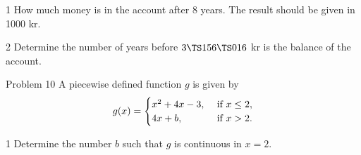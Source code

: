 \begin{delopgave}{1}
	How much money is in the account after 8 years. The result should be given in 1000 kr. 
\end{delopgave}
\begin{delopgave}{2}
	Determine the number of years before $3 \TS 156 \TS 016$ kr is the balance of the account.
\end{delopgave}
%
%
\begin{opgavetekst}{Problem 10}
	A piecewise defined function $g$ is given by
	\begin{align*}
		g(x) = 
		\begin{cases}
			x^2 + 4x - 3,  &\textnormal{ if }x \leq 2,\\
			4x + b,  &\textnormal{ if }x > 2.
		\end{cases}
	\end{align*}
\end{opgavetekst}
\begin{delopgave}{1}
	Determine the number $b$ such that $g$ is continuous in $x = 2$. 
\end{delopgave}
